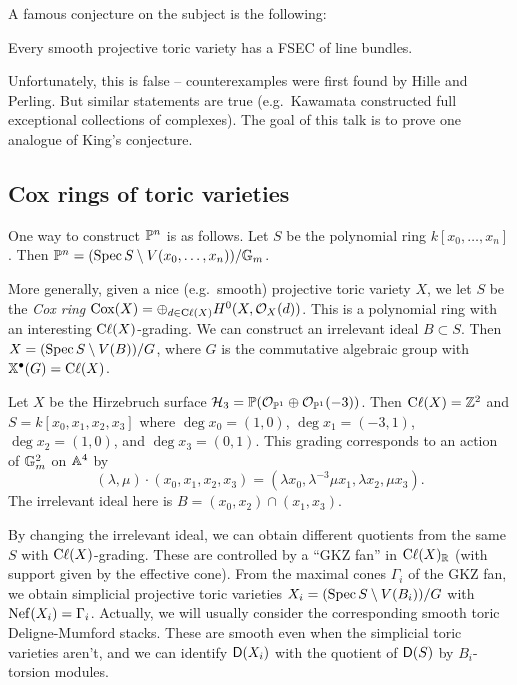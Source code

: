 \documentclass{article}
\begin{document}
A famous conjecture on the subject is the following:

\begin{conj}[King]
	Every smooth projective toric variety has a FSEC of line bundles.
\end{conj}

Unfortunately, this is false -- counterexamples were first found by Hille and Perling.
But similar statements are true (e.g.\ Kawamata constructed full exceptional collections of complexes).
The goal of this talk is to prove one analogue of King's conjecture.

\subsection{Cox rings of toric varieties}

One way to construct $\PP^n$ is as follows.
Let $S$ be the polynomial ring $k[x_0, \dots, x_n]$.
Then $\PP^n = (\Spec S \setminus V(x_0, \dots, x_n)) / \GG_m$.

More generally, given a nice (e.g.\ smooth) projective toric variety $X$, we let $S$ be the \emph{Cox ring} $\Cox(X) = \oplus_{d \in \Cl(X)} H^0(X, \Oc_X(d))$.
This is a polynomial ring with an interesting $\Cl(X)$-grading.
We can construct an irrelevant ideal $B \subset S$.
Then $X = (\Spec S \setminus V(B)) / G$, where $G$ is the commutative algebraic group with $\weight(G) = \Cl(X)$.

\begin{ex}
	Let $X$ be the Hirzebruch surface $\Hc_3 = \PP(\Oc_{\PP^1} \oplus \Oc_{\PP^1}(-3))$.
	Then $\Cl(X) = \ZZ^2$ and $S = k[x_0, x_1, x_2, x_3]$ where $\deg x_0 = (1, 0)$, $\deg x_1 = (-3, 1)$, $\deg x_2 = (1, 0)$, and $\deg x_3 = (0, 1)$.
	This grading corresponds to an action of $\GG_m^2$ on $\AA^4$ by
	\[
		(\lambda, \mu) \cdot (x_0, x_1, x_2, x_3) = (\lambda x_0, \lambda^{-3} \mu x_1, \lambda x_2, \mu x_3).
	\]
	The irrelevant ideal here is $B = (x_0, x_2) \cap (x_1, x_3)$.
\end{ex}

By changing the irrelevant ideal, we can obtain different quotients from the same $S$ with $\Cl(X)$-grading.
These are controlled by a ``GKZ fan'' in $\Cl(X)_\RR$ (with support given by the effective cone).
From the maximal cones $\Gamma_i$ of the GKZ fan, we obtain simplicial projective toric varieties $X_i = (\Spec S \setminus V(B_i)) / G$ with $\Nef(X_i) = \Gamma_i$.
Actually, we will usually consider the corresponding smooth toric Deligne-Mumford stacks.
These are smooth even when the simplicial toric varieties aren't, and we can identify $\Dsf(X_i)$ with the quotient of $\Dsf(S)$ by $B_i$-torsion modules.
\end{document}
